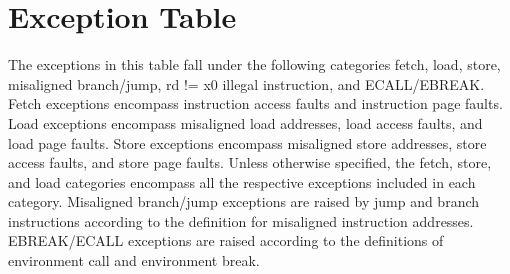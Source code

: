 \documentclass[12pt]{article}
\begin{document}
\section{Exception Table}
The exceptions in this table fall under the following categories fetch, load, store, misaligned branch/jump, rd != x0 illegal instruction, and ECALL/EBREAK. Fetch exceptions encompass instruction access faults and instruction page faults. Load exceptions encompass misaligned load addresses, load access faults, and load page faults. Store exceptions encompass misaligned store addresses, store access faults, and store page faults. Unless otherwise specified, the fetch, store, and load categories encompass all the respective exceptions included in each category. Misaligned branch/jump exceptions are raised by jump and branch instructions according to the definition for misaligned instruction addresses. EBREAK/ECALL exceptions are raised according to the definitions of environment call and environment break.
\end{document}

